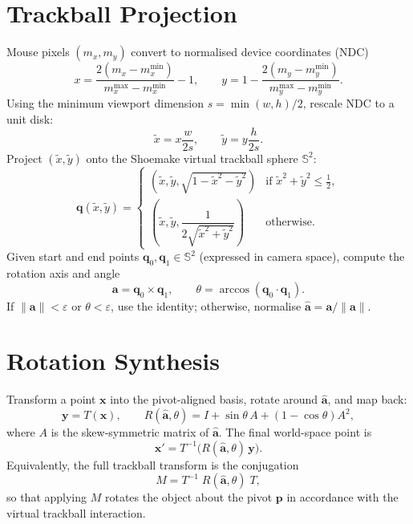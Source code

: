 \documentclass[11pt]{article}
\begin{document}
\section{Trackball Projection}
Mouse pixels $(m_x, m_y)$ convert to normalised device coordinates (NDC)
\begin{equation}
    x = \frac{2(m_x - m_x^{\min})}{m_x^{\max} - m_x^{\min}} - 1, \qquad
    y = 1 - \frac{2(m_y - m_y^{\min})}{m_y^{\max} - m_y^{\min}}.
\end{equation}
Using the minimum viewport dimension $s = \min(w, h) / 2$, rescale NDC to a unit disk:
\begin{equation}
    \tilde{x} = x \frac{w}{2s}, \qquad \tilde{y} = y \frac{h}{2s}.
\end{equation}
Project $(\tilde{x}, \tilde{y})$ onto the Shoemake virtual trackball sphere $\mathbb{S}^2$:
\begin{equation}
    \mathbf{q}(\tilde{x}, \tilde{y}) =
    \begin{cases}
        (\tilde{x},\tilde{y},\sqrt{1-\tilde{x}^2-\tilde{y}^2}) & \text{if } \tilde{x}^2+\tilde{y}^2 \le \tfrac{1}{2},\\[4pt]
        \left(\tilde{x},\tilde{y},\dfrac{1}{2\sqrt{\tilde{x}^2+\tilde{y}^2}}\right) & \text{otherwise.}
    \end{cases}
\end{equation}
Given start and end points $\mathbf{q}_0, \mathbf{q}_1 \in \mathbb{S}^2$ (expressed in camera space), compute the rotation axis and angle
\begin{equation}
    \mathbf{a} = \mathbf{q}_0 \times \mathbf{q}_1, \qquad
    \theta = \arccos(\mathbf{q}_0 \cdot \mathbf{q}_1).
\end{equation}
If $\|\mathbf{a}\| < \varepsilon$ or $\theta < \varepsilon$, use the identity; otherwise, normalise $\hat{\mathbf{a}} = \mathbf{a} / \|\mathbf{a}\|$.

\section{Rotation Synthesis}
Transform a point $\mathbf{x}$ into the pivot-aligned basis, rotate around $\hat{\mathbf{a}}$, and map back:
\begin{equation}
    \mathbf{y} = T(\mathbf{x}), \qquad
    R(\hat{\mathbf{a}}, \theta) = I + \sin\theta\,A + (1-\cos\theta)A^2,
\end{equation}
where $A$ is the skew-symmetric matrix of $\hat{\mathbf{a}}$. The final world-space point is
\begin{equation}
    \mathbf{x}' = T^{-1}\big(R(\hat{\mathbf{a}}, \theta)\,\mathbf{y}\big).
\end{equation}
Equivalently, the full trackball transform is the conjugation
\begin{equation}
    M = T^{-1}\;R(\hat{\mathbf{a}}, \theta)\;T,
\end{equation}
so that applying $M$ rotates the object about the pivot $\mathbf{p}$ in accordance with the virtual trackball interaction.
\end{document}
